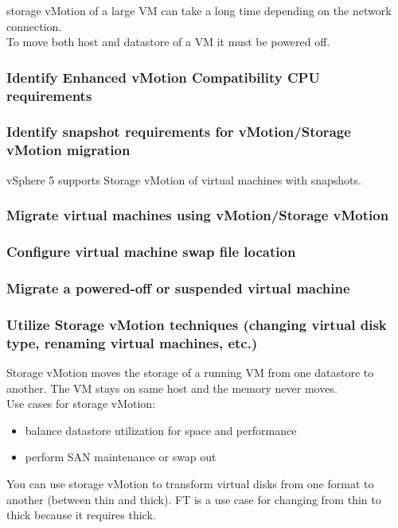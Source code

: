 storage vMotion of a large VM can take a long time depending on the network
connection.\\

To move both host and datastore of a VM it must be powered off.

\subsubsection{Identify Enhanced vMotion Compatibility CPU requirements}

\subsubsection{Identify snapshot requirements for vMotion/Storage vMotion migration}

vSphere 5 supports Storage vMotion of virtual machines with snapshots.

\subsubsection{Migrate virtual machines using vMotion/Storage vMotion}

\subsubsection{Configure virtual machine swap file location}

\subsubsection{Migrate a powered-off or suspended virtual machine}

\subsubsection{Utilize Storage vMotion techniques (changing virtual disk type, renaming virtual machines, etc.)}

Storage vMotion moves the storage of a running VM from one datastore to
another. The VM stays on same host and the memory never moves.\\

Use cases for storage vMotion:

\begin{itemize}
\item balance datastore utilization for space and performance
\item perform SAN maintenance or swap out
\end{itemize}

You can use storage vMotion to transform virtual disks from one format to
another (between thin and thick). FT is a use case for changing from thin to
thick because it requires thick.
